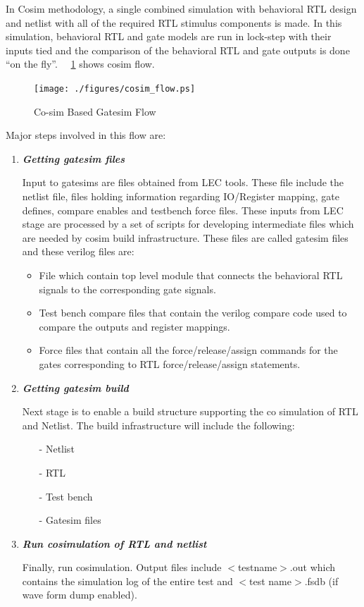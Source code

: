  In Cosim methodology, a single combined simulation with behavioral RTL design and netlist with all of the required RTL stimulus components is made. In this simulation, behavioral RTL and gate models are run in lock-step with their inputs tied and the comparison of the behavioral RTL and gate outputs is done ``on the fly''. ~\figurename{~\ref{fig:cosim_flow.eps}} shows cosim flow.




\begin{figure}[H]
\centering
\texttt{[image: ./figures/cosim\_flow.ps]}
\caption{Co-sim Based Gatesim Flow}
\label{fig:cosim_flow.eps}
\end{figure}

Major steps involved in this flow are:

\begin{enumerate}
	\item \emph{\bf Getting gatesim files}

	Input to gatesims are files obtained from LEC tools. These file include the netlist file, files holding information regarding IO/Register mapping, gate defines, compare enables and testbench force files. These inputs from LEC stage are processed by a set of scripts for developing intermediate files which are needed by cosim build infrastructure. These files are called gatesim files and these verilog files are:
	\begin{itemize}
		\item File which contain top level module that connects the behavioral RTL signals to the corresponding gate signals.
		\item Test bench compare files that contain the verilog compare code used to compare the outputs and register mappings.
		\item Force files that contain all the force/release/assign commands for the gates corresponding to RTL force/release/assign statements.
	\end{itemize}

	\item \emph{\bf Getting gatesim build} 

	Next stage is to enable a build structure supporting the co simulation of RTL and Netlist. The build infrastructure will include the following:
	\begin{itemize}
		\item[-]Netlist
		\item[-]RTL
		\item[-]Test bench
		\item[-]Gatesim files
	\end{itemize}

	\item \emph{\bf Run cosimulation of RTL and netlist}

	Finally, run cosimulation. Output files include $<$testname$>$.out which contains the simulation log of the entire test and $<$test name$>$.fsdb (if wave form dump enabled).
\end{enumerate}


